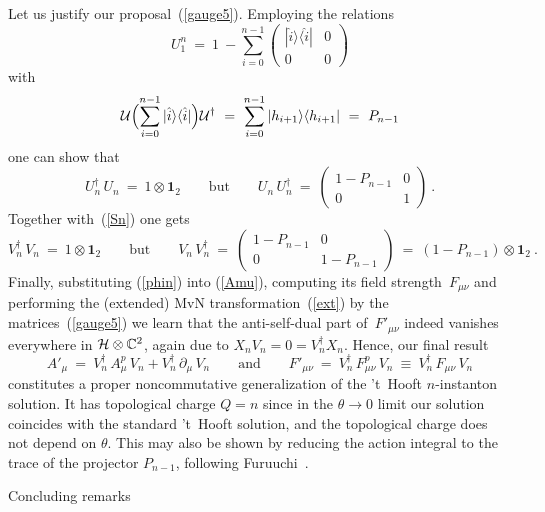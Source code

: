 \documentclass[a4paper,11pt]{article}
\makeatletter
\renewcommand{\section}{\@startsection{section}{1}{0pt}{\medskipamount}
{\medskipamount}{\large\bf}}
\numberwithin{equation}{section}
\def\th{\theta}
\newcommand{\C}{\mathbb C}
\newcommand{\Hcal}{{\cal H}}
\newcommand{\U}{{\cal U}}
\def\pa{\mbox{$\partial$}}
\def\>{\rangle}
\def\<{\langle}
\def\+{\dagger}
\makeatother
\begin{document}
{Let us justify our proposal~(\ref{gauge5}).
Employing the relations
\begin{equation}
U_1^n\ =\ 1\ - \sum_{i=0}^{n-1} \begin{pmatrix}
|\hat{i}\>\<\hat{i}| & 0 \\ 0 & 0 \end{pmatrix}
\end{equation}
with
\begin{equation}
\U\Bigl( \sum_{i=0}^{n-1} |\hat{i}\>\<\hat{i}| \Bigr) {\U}^\+ \ =\
\sum_{i=0}^{n-1} |h_{i+1}\>\<h_{i+1}|\ =\ P_{n-1}
\end{equation}
one can show that
\begin{equation}
U_n^\+\,U_n\ =\ 1\otimes {\mathbf 1}_2 \qquad\textrm{but}\qquad
U_n\,U_n^\+\ =\
\begin{pmatrix}1{-}P_{n-1}&0\\0&1\end{pmatrix}\ .
\end{equation}
Together with~(\ref{Sn}) one gets
\begin{equation}
V_n^\+\,V_n\ =\ 1\otimes {\mathbf 1}_2 \qquad\textrm{but}\qquad
V_n\,V_n^\+\ =\ 
\begin{pmatrix}1{-}P_{n-1}&0\\0&1{-}P_{n-1}\end{pmatrix}
\ =\ (1-P_{n-1})\otimes {\mathbf 1}_2\ .
\end{equation}
{}Finally, substituting (\ref{phin}) into (\ref{Amu}),
computing its field strength~$F_{\mu\nu}$ and performing 
the (extended) MvN transformation~(\ref{ext}) by the matrices~(\ref{gauge5}) 
we learn that the anti-self-dual part of~$F'_{\mu\nu}$ 
indeed vanishes everywhere in $\Hcal\otimes\C^2$, again due to
$X_nV_n=0=V^\+_nX_n$. Hence, our final result
\begin{equation}
A'_\mu\ =\ V^\+_n\,A^p_\mu\,V_n + V^\+_n\,\pa_\mu\,V_n
\qquad\textrm{and}\qquad
F'_{\mu\nu}\ =\ V^\+_n\,F_{\mu\nu}^p\,V_n\ \equiv\ V^\+_n\,F_{\mu\nu}\,V_n
\end{equation}
constitutes a proper noncommutative generalization 
of the 't~Hooft $n$-instanton solution. 
It has topological charge $Q=n$ since in the $\th\to0$ limit our 
solution coincides with the standard 't~Hooft solution, and the 
topological charge does not depend on $\th$. This may also be shown by 
reducing the action integral to the trace of the projector $P_{n-1}$, 
following Furuuchi~\cite{Furuuchi:2000vc}.


\section{Concluding remarks}

}
\end{document}
